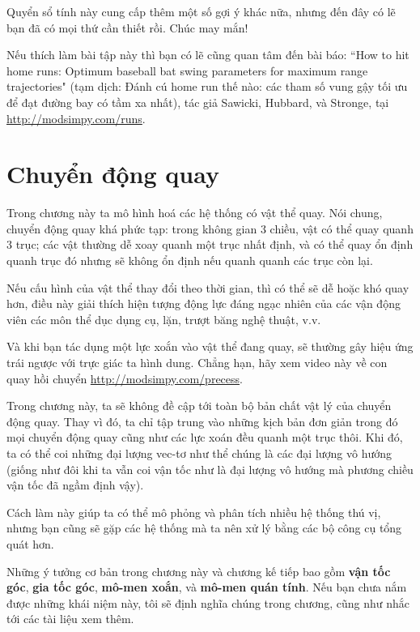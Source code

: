 \documentclass[12pt]{book}
\theoremstyle{exercise}
\begin{document}
Quyển sổ tính này cung cấp thêm một số gợi ý khác nữa, nhưng đến đây có lẽ bạn đã có mọi thứ cần thiết rồi.  Chúc may mắn!

Nếu thích làm bài tập này thì bạn có lẽ cũng quan tâm đến bài báo: ``How to hit home runs: Optimum baseball bat swing parameters for maximum range trajectories" (tạm dịch: Đánh cú home run thế nào: các tham số vung gậy tối ưu để đạt đường bay có tầm xa nhất), tác giả Sawicki, Hubbard, và Stronge, tại \url{http://modsimpy.com/runs}.


\chapter{Chuyển động quay}
\label{chap24}

Trong chương này ta mô hình hoá các hệ thống có vật thể quay. Nói chung, chuyển động quay khá phức tạp: trong không gian 3 chiều, vật có thể quay quanh 3 trục; các vật thường dễ xoay quanh một trục nhất định, và có thể quay ổn định quanh trục đó nhưng sẽ không ổn định nếu quanh quanh các trục còn lại.


Nếu cấu hình của vật thể thay đổi theo thời gian, thì có thể sẽ dễ hoặc khó quay hơn, điều này giải thích hiện tượng động lực đáng ngạc nhiên của các vận động viên các môn thể dục dụng cụ, lặn, trượt băng nghệ thuật, v.v.

Và khi bạn tác dụng một lực xoắn vào vật thể đang quay, sẽ thường gây hiệu ứng trái ngược với trực giác ta hình dung. Chẳng hạn, hãy xem video này về con quay hồi chuyển \url{http://modsimpy.com/precess}.


Trong chương này, ta sẽ không đề cập tới toàn bộ bản chất vật lý của chuyển động quay. Thay vì đó, ta chỉ tập trung vào những kịch bản đơn giản trong đó mọi chuyển động quay cũng như các lực xoán đều quanh một trục thôi. Khi đó, ta có thể coi những đại lượng vec-tơ như thể chúng là các đại lượng vô hướng (giống như đôi khi ta vẫn coi vận tốc như là đại lượng vô hướng mà phương chiều vận tốc đã ngầm định vậy).


Cách làm này giúp ta có thể mô phỏng và phân tích nhiều hệ thống thú vị, nhưng bạn cũng sẽ gặp các hệ thống mà ta nên xử lý bằng các bộ công cụ tổng quát hơn.

Những ý tưởng cơ bản trong chương này và chương kế tiếp bao gồm {\bf vận tốc góc}, {\bf gia tốc góc}, {\bf mô-men xoắn}, và {\bf mô-men quán tính}.  Nếu bạn chưa nắm được những khái niệm này, tôi sẽ định nghĩa chúng trong chương, cũng như nhắc tới các tài liệu xem thêm.
\end{document}
